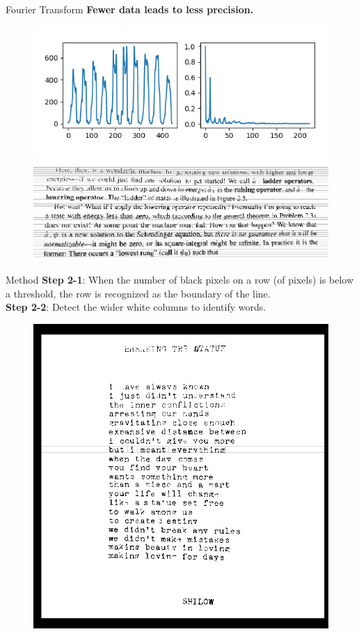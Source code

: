 \documentclass{beamer}
\begin{document}
\begin{frame}{Fourier Transform}
	\textbf{Fewer data leads to less precision.}
	\begin{figure}[H]
		\includegraphics[width=0.55\linewidth]{./fourier2.png}
		\includegraphics[width=0.70\linewidth]{./imgslice2.png}
	\end{figure}
\end{frame}

\begin{frame}{Method}
	\textbf{Step 2-1}: When the number of black pixels on a row (of pixels) is below a threshold, the row is recognized as the boundary of the line.\\
		\textbf{Step 2-2}: Detect the wider white columns to identify words.\\
		\begin{figure}[h]
			\centering
			\includegraphics[width=0.50\linewidth]{./raw_done.png}
		\end{figure}
\end{frame}
\end{document}
